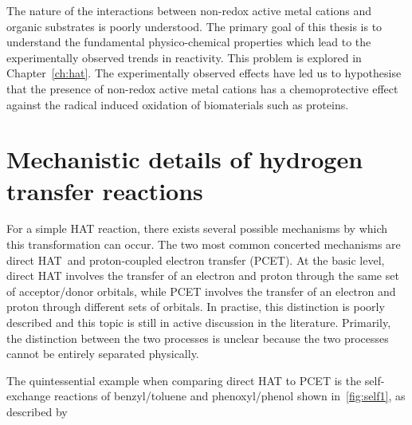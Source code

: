 The nature of the interactions between non-redox active metal cations and organic substrates is poorly understood. The primary goal of this thesis is to understand the fundamental physico-chemical properties which lead to the experimentally observed trends in reactivity. This problem is explored in Chapter~\ref{ch:hat}. The experimentally observed effects have led us to hypothesise that the presence of non-redox active metal cations has a chemoprotective effect against the radical induced oxidation of biomaterials such as proteins.

\section{Mechanistic details of hydrogen transfer reactions}

For a simple HAT reaction, there exists several possible mechanisms by which this transformation can occur. The two most common concerted mechanisms are direct HAT\footnotemark~and proton-coupled electron transfer (PCET). At the basic level, direct HAT involves the transfer of an electron and proton through the same set of acceptor/donor orbitals, while PCET involves the transfer of an electron and proton through different sets of orbitals. In practise, this distinction is poorly described and this topic is still in active discussion in the literature.\cite{Cukier1998, Mayer2002, Stubbe2003, Mayer2004, DiLabio2007, Huynh2007, HammesSchiffer2008, Mayer2010, Weinberg2012, HammesSchiffer2015, MunozRugeles2017} Primarily, the distinction between the two processes is unclear because the two processes cannot be entirely separated physically.\cite{DiLabio2007}


The quintessential example when comparing direct HAT to PCET is the self-exchange reactions of benzyl/toluene and phenoxyl/phenol shown in~\ref{fig:self1}, as described by \citet{Mayer2002}


